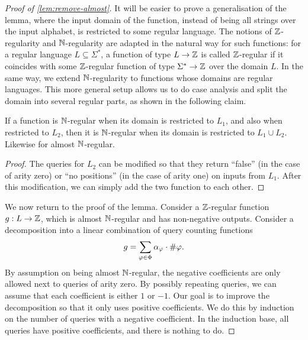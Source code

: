     \begin{proof}[Proof of \cref{lem:remove-almost}]
        It will be easier to prove a generalisation of the lemma,  where the input domain of the function, instead of being  all strings over the input alphabet, is restricted to  some regular language. The notions of ${\mathbb Z}$-regularity and ${\mathbb N}$-regularity are adapted in the natural way for such functions: for a regular language $L \subseteq \Sigma^*$, a function of type  $ L \to {\mathbb Z}$ is called ${\mathbb Z}$-regular if it coincides with some ${\mathbb Z}$-regular function of type $ \Sigma^* \to {\mathbb Z}$ over the domain $L$. In the same way, we extend  ${\mathbb N}$-regularity to functions whose domains are regular languages. This more general setup allows us to do case analysis and split the domain into several regular parts, as shown in the  following claim.


    \begin{claim}\label{claim:aggregate-two-domains} If a  function  is  ${\mathbb N}$-regular when its domain is restricted to $L_1$,  and also when restricted to $L_2$, then it is  ${\mathbb N}$-regular when its domain is restricted to $L_1 \cup L_2$. Likewise for almost ${\mathbb N}$-regular.
    \end{claim}
    \begin{proof}
        The queries for $L_2$ can be modified so that they return ``false'' (in the case of arity zero) or ``no positions'' (in the case of arity one) on inputs from $L_1$. After this modification, we can simply add the two function to each other.
    \end{proof}

     We now return to the proof of the lemma.  
         Consider a ${\mathbb Z}$-regular function $g : L \to {\mathbb Z}$, which is almost ${\mathbb N}$-regular and has non-negative outputs. Consider  a decomposition into a linear combination of query counting functions 
        \begin{align*}
        g = \sum_{\varphi \in \Phi} \alpha_\varphi \cdot \#{\varphi}.
        \end{align*}
        By assumption on being almost ${\mathbb N}$-regular, the negative coefficients are only allowed next to queries of arity zero. 
        By possibly repeating queries, we can assume that each coefficient is either $1$ or $-1$. Our goal is to improve the decomposition so that it only uses positive coefficients. We do this by induction on the number of queries with a negative coefficient. In the induction base, all queries have positive coefficients, and there is nothing to do.


\end{proof}
